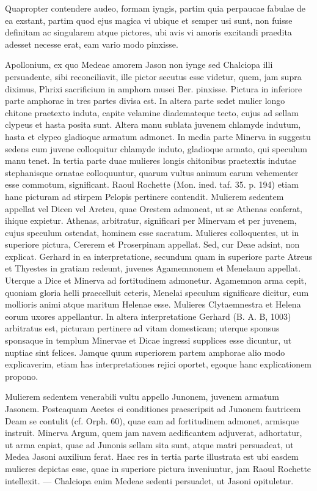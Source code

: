 \documentclass[a4paper, 11pt, oneside, polutonikogreek, german]{article}
\begin{document}
Quapropter contendere audeo, formam iyngis, partim quia perpaucae fabulae de ea exstant, partim quod ejus magica vi ubique et semper usi sunt, non fuisse definitam ac singularem atque pictores, ubi avis vi amoris excitandi praedita adesset necesse erat, eam vario modo pinxisse.

Apollonium, ex quo Medeae amorem Jason non iynge sed Chalciopa illi persuadente, sibi reconciliavit, ille pictor secutus esse videtur, quem, jam supra diximus, Phrixi sacrificium in amphora musei Ber. pinxisse. Pictura in inferiore parte amphorae in tres partes divisa est. In altera parte sedet mulier longo chitone praetexto induta, capite velamine diademateque tecto, cujus ad sellam clypeus et hasta posita sunt. Altera manu sublata juvenem chlamyde indutum, hasta et clypeo gladioque armatum admonet. In media parte Minerva in suggestu sedens cum juvene colloquitur chlamyde induto, gladioque armato, qui speculum manu tenet. In tertia parte duae mulieres longis chitonibus praetextis indutae stephanisque ornatae colloquuntur, quarum vultus animum earum vehementer esse commotum, significant. Raoul Rochette (Mon. ined. taf. 35. p. 194) etiam hanc picturam ad stirpem Pelopis pertinere contendit. Mulierem sedentem appellat vel Dicen vel Areteu, quae Orestem admoneat, ut se Athenas conferat, ihique expietur. Athenas, arbitratur, significari per Minervam et per juvenem, cujus speculum ostendat, hominem esse sacratum. Mulieres colloquentes, ut in superiore pictura, Cererem et Proserpinam appellat. Sed, cur Deae adsint, non explicat. Gerhard in ea interpretatione, secundum quam in superiore parte Atreus et Thyestes in gratiam redeunt, juvenes Agamemnonem et Menelaum appellat. Uterque a Dice et Minerva ad fortitudinem admonetur. Agamemnon arma cepit, quoniam gloria helli praecelluit ceteris, Menelai speculum significare dicitur, eum mollioris animi atque maritum Helenae esse. Mulieres Clytaemnestra et Helena eorum uxores appellantur. In altera interpretatione Gerhard (B. A. B, 1003) arbitratus est, picturam pertinere ad vitam domesticam; uterque sponsus sponsaque in templum Minervae et Dicae ingressi supplices esse dicuntur, ut nuptiae sint felices. Jamque quum superiorem partem amphorae alio modo explicaverim, etiam has interpretationes rejici oportet, egoque hanc explicationem propono.

Mulierem sedentem venerabili vultu appello Junonem, juvenem armatum Jasonem. Posteaquam Aeetes ei conditiones praescripsit ad Junonem fautricem Deam se contulit (cf. Orph. 60), quae eam ad fortitudinem admonet, armisque instruit. Minerva Argum, quem jam navem aedificantem adjuverat, adhortatur, ut arma capiat, quae ad Junonis sellam sita sunt, atque matri persuadeat, ut Medea Jasoni auxilium ferat. Haec res in tertia parte illustrata est ubi easdem mulieres depictas esse, quae in superiore pictura inveniuntur, jam Raoul Rochette intellexit. --- Chalciopa enim Medeae sedenti persuadet, ut Jasoni opituletur.
\end{document}
